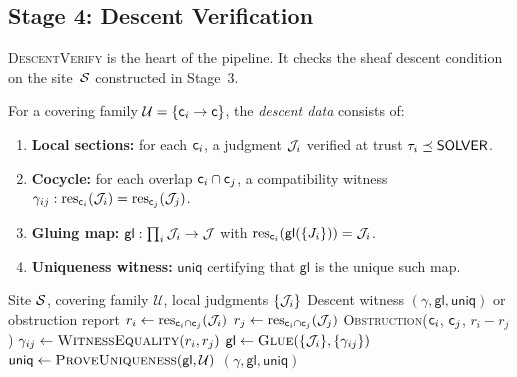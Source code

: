 \documentclass[11pt]{article}
\newcommand{\CoverFam}{\mathcal{U}}
\newcommand{\Cocycle}{\gamma}
\newcommand{\GlueMap}{\mathsf{gl}}
\newcommand{\UniqWit}{\mathsf{uniq}}
\newcommand{\DescentVerify}{\textsc{DescentVerify}}
\begin{document}
\subsection{Stage 4: Descent Verification}\label{sec:stage4}

\DescentVerify{} is the heart of the pipeline.  It checks the sheaf
descent condition on the site~$\mathcal{S}$ constructed in Stage~3.

\begin{definition}\label{def:descent-data}
For a covering family $\CoverFam = \{\coord_i \to \coord\}$, the
\emph{descent data} consists of:
\begin{enumerate}[noitemsep]
  \item \textbf{Local sections:} for each $\mathsf{c}_i$, a judgment
    $\mathcal{J}_i$ verified at trust $\tau_i \preceq \mathsf{SOLVER}$.
  \item \textbf{Cocycle:} for each overlap
    $\mathsf{c}_i \cap \mathsf{c}_j$, a compatibility witness
    $\Cocycle_{ij} : \res_{\coord_i}(\J_i) = \res_{\coord_j}(\J_j)$.
  \item \textbf{Gluing map:} $\GlueMap : \prod_i \J_i \to \J$ with
    $\res_{\coord_i}(\GlueMap(\{J_i\})) = \J_i$.
  \item \textbf{Uniqueness witness:} $\UniqWit$ certifying that
    $\GlueMap$ is the unique such map.
\end{enumerate}
\end{definition}

\begin{algorithm}[t]
\caption{\DescentVerify: Sheaf descent verification}\label{alg:descent-verify}
\begin{algorithmic}[1]
\REQUIRE Site $\mathcal{S}$, covering family $\CoverFam$, local judgments
  $\{\mathcal{J}_i\}$
\ENSURE Descent witness $(\Cocycle, \GlueMap, \UniqWit)$ or
  obstruction report
  \STATE $r_i \leftarrow \mathrm{res}_{\mathsf{c}_i \cap \mathsf{c}_j}(\mathcal{J}_i)$
  \STATE $r_j \leftarrow \mathrm{res}_{\mathsf{c}_i \cap \mathsf{c}_j}(\mathcal{J}_j)$
    \RETURN \textsc{Obstruction}($\mathsf{c}_i$, $\mathsf{c}_j$,
      $r_i - r_j$)
  \ENDIF
  \STATE $\Cocycle_{ij} \leftarrow \textsc{WitnessEquality}(r_i, r_j)$
\ENDFOR
\STATE $\GlueMap \leftarrow \GLUE(\{\J_i\}, \{\Cocycle_{ij}\})$
\STATE $\UniqWit \leftarrow \textsc{ProveUniqueness}(\GlueMap, \CoverFam)$
\RETURN $(\Cocycle, \GlueMap, \UniqWit)$
\end{algorithmic}
\end{algorithm}
\end{document}
